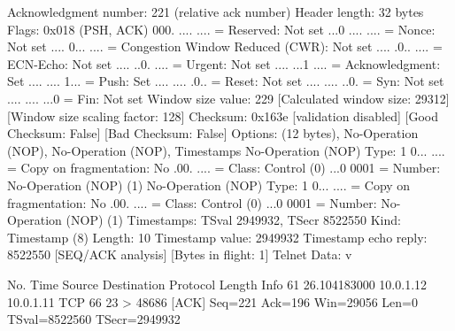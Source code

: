     Acknowledgment number: 221    (relative ack number)
    Header length: 32 bytes
    Flags: 0x018 (PSH, ACK)
        000. .... .... = Reserved: Not set
        ...0 .... .... = Nonce: Not set
        .... 0... .... = Congestion Window Reduced (CWR): Not set
        .... .0.. .... = ECN-Echo: Not set
        .... ..0. .... = Urgent: Not set
        .... ...1 .... = Acknowledgment: Set
        .... .... 1... = Push: Set
        .... .... .0.. = Reset: Not set
        .... .... ..0. = Syn: Not set
        .... .... ...0 = Fin: Not set
    Window size value: 229
    [Calculated window size: 29312]
    [Window size scaling factor: 128]
    Checksum: 0x163e [validation disabled]
        [Good Checksum: False]
        [Bad Checksum: False]
    Options: (12 bytes), No-Operation (NOP), No-Operation (NOP), Timestamps
        No-Operation (NOP)
            Type: 1
                0... .... = Copy on fragmentation: No
                .00. .... = Class: Control (0)
                ...0 0001 = Number: No-Operation (NOP) (1)
        No-Operation (NOP)
            Type: 1
                0... .... = Copy on fragmentation: No
                .00. .... = Class: Control (0)
                ...0 0001 = Number: No-Operation (NOP) (1)
        Timestamps: TSval 2949932, TSecr 8522550
            Kind: Timestamp (8)
            Length: 10
            Timestamp value: 2949932
            Timestamp echo reply: 8522550
    [SEQ/ACK analysis]
        [Bytes in flight: 1]
Telnet
    Data: v

No.     Time           Source                Destination           Protocol Length Info
     61 26.104183000   10.0.1.12             10.0.1.11             TCP      66     23 > 48686 [ACK] Seq=221 Ack=196 Win=29056 Len=0 TSval=8522560 TSecr=2949932


